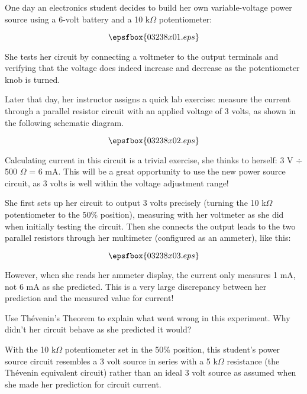 

One day an electronics student decides to build her own variable-voltage power source using a 6-volt battery and a 10 k$\Omega$ potentiometer:

$$\epsfbox{03238x01.eps}$$

She tests her circuit by connecting a voltmeter to the output terminals and verifying that the voltage does indeed increase and decrease as the potentiometer knob is turned.

Later that day, her instructor assigns a quick lab exercise: measure the current through a parallel resistor circuit with an applied voltage of 3 volts, as shown in the following schematic diagram.

$$\epsfbox{03238x02.eps}$$

Calculating current in this circuit is a trivial exercise, she thinks to herself: 3 V $\div$ 500 $\Omega$ = 6 mA.  This will be a great opportunity to use the new power source circuit, as 3 volts is well within the voltage adjustment range!

She first sets up her circuit to output 3 volts precisely (turning the 10 k$\Omega$ potentiometer to the 50\% position), measuring with her voltmeter as she did when initially testing the circuit.  Then she connects the output leads to the two parallel resistors through her multimeter (configured as an ammeter), like this:

$$\epsfbox{03238x03.eps}$$

However, when she reads her ammeter display, the current only measures 1 mA, not 6 mA as she predicted.  This is a very large discrepancy between her prediction and the measured value for current!

\vskip 10pt

Use Th\'evenin's Theorem to explain what went wrong in this experiment.  Why didn't her circuit behave as she predicted it would?







With the 10 k$\Omega$ potentiometer set in the 50\% position, this student's power source circuit resembles a 3 volt source in series with a 5 k$\Omega$ resistance (the Th\'evenin equivalent circuit) rather than an ideal 3 volt source as assumed when she made her prediction for circuit current.


